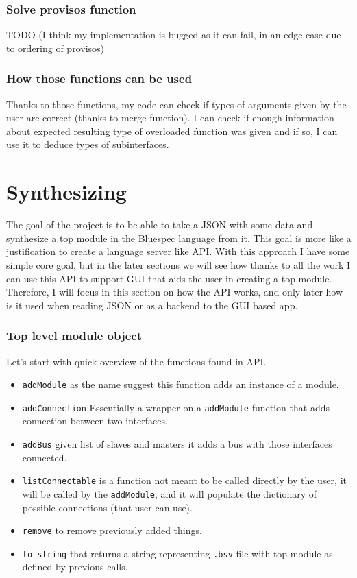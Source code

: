 \documentclass[14pt]{report}
\begin{document}
\subsubsection*{Solve provisos function}
TODO (I think my implementation is bugged as it can fail, in an edge case due to ordering of provisos)

\subsubsection*{How those functions can be used}
Thanks to those functions, my code can check if types of arguments given by the user are correct (thanks to merge function). I can check if enough information about expected resulting type of overloaded function was given and if so, I can use it to deduce types of subinterfaces.

\section{Synthesizing}
The goal of the project is to be able to take a JSON with some data and synthesize a top module in the Bluespec language from it. This goal is more like a justification to create a language server like API. With this approach I have some simple core goal, but in the later sections we will see how thanks to all the work I can use this API to support GUI that aids the user in creating a top module. Therefore, I will focus in this section on how the API works, and only later how is it used when reading JSON or as a backend to the GUI based app.

\subsubsection*{Top level module object}
Let's start with quick overview of the functions found in API.
\begin{itemize}
    \item \verb!addModule! as the name suggest this function adds an instance of a module.
    \item \verb!addConnection! Essentially a wrapper on a \verb!addModule! function that adds connection between two interfaces.
    \item \verb!addBus! given list of slaves and masters it adds a bus with those interfaces connected.
    \item \verb!listConnectable! is a function not meant to be called directly by the user, it will be called by the \verb!addModule!, and it will populate the dictionary of possible connections (that user can use).
    \item \verb!remove! to remove previously added things.
    \item \verb!to_string! that returns a string representing \verb!.bsv! file with top module as defined by previous calls.
\end{itemize}
\end{document}
